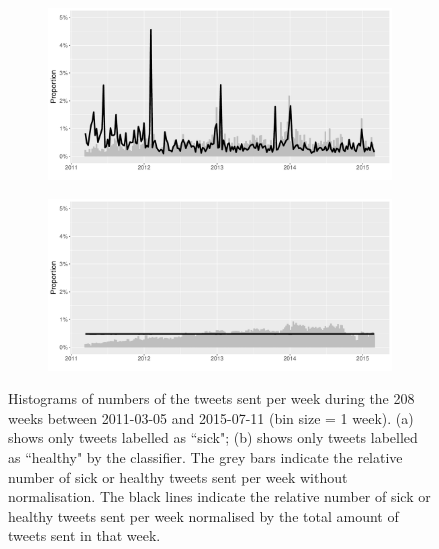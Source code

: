 \documentclass[11pt, a4paper,twoside]{report}\usepackage[]{graphicx}\usepackage[]{color}
\begin{document}
\begin{figure}[H]
\centering
  \begin{subfigure}[t]{1\textwidth}
  \includegraphics[width=1\linewidth]{12_activity_sick_date_Twitter_full_aggregatedoverlay.pdf}
  \caption{}
  \end{subfigure}
  
  \bigskip 

    \begin{subfigure}[t]{1\textwidth}
  \includegraphics[width=1\linewidth]{13_activity_healthy_date_Twitter_full_aggregatedoverlay.pdf}
  \caption{}
  \end{subfigure}
  \caption{Histograms of numbers of the tweets sent per week during the 208 weeks between 2011-03-05 and 2015-07-11 (bin size = 1 week). (a) shows only tweets labelled as ``sick"; (b) shows only tweets labelled as ``healthy" by the classifier. The grey bars indicate the relative number of sick or healthy tweets sent per week without normalisation. The black lines indicate the relative number of sick or healthy tweets sent per week normalised by the total amount of tweets sent in that week.}
  \label{fig:tweets_seasonal_healthy_sick}
\end{figure}
\end{document}
